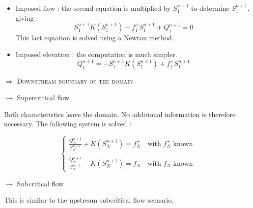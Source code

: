 \vspace{0.5cm}

\begin{itemize}
 \item Imposed flow : the second equation is multiplied by $S_{1}^{n+1}$ to determine $S_{1}^{n+1}$, giving :
   \begin{equation}
     S_{1}^{n+1} K(S_{1}^{n+1}) - f_{1}^+ S_{1}^{n+1} + Q_{1}^{n+1} = 0
   \end{equation}
   This last equation is solved using a Newton method.
 \item Imposed elevation : the computation is much simpler.
   \begin{equation}
      Q_{1}^{n+1} = -S_{1}^{n+1} K(S_{1}^{n+1}) + f_{1}^+ S_{1}^{n+1}
   \end{equation}
\end{itemize}

\vspace{0.5cm}

$\Longrightarrow$ \textsc{Downstream boundary of the domain}

\vspace{0.5cm}

$\rightarrow$ Supercritical flow

\vspace{0.5cm}

Both characteristics leave the domain. No additional information is therefore necessary. The following system is solved :

\begin{equation}
 \left \lbrace
  \begin{array}{l}
    \frac{Q_{N}^{n+1}}{S_{N}^{n+1}} + K(S_{N}^{n+1}) = f_{N}^+ \quad \mbox{with } f_{N}^+ \mbox{ known} \\
    \\
    \frac{Q_{N}^{n+1}}{S_{N}^{n+1}} - K(S_{N}^{n+1}) = f_{N}^- \quad \mbox{with } f_{N}^- \mbox{ known}
  \end{array}
 \right.
\end{equation}

\vspace{0.5cm}

$\rightarrow$ Subcritical flow

\vspace{0.5cm}

This is similar to the upstream subcritical flow scenario.

\vspace{0.5cm}

